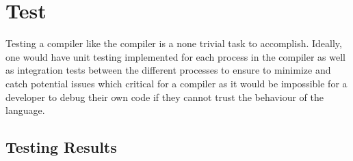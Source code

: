 \section{Test}
\label{sec:Test}

Testing a compiler like the \lang{} compiler is a none trivial task to
accomplish. Ideally, one would have unit testing implemented for each process in the
compiler as well as integration tests between the different processes to ensure
to minimize and catch potential issues which critical for a compiler as it would
be impossible for a developer to debug their own code if they cannot trust the
behaviour of the language.

\subsection{Testing Results}


